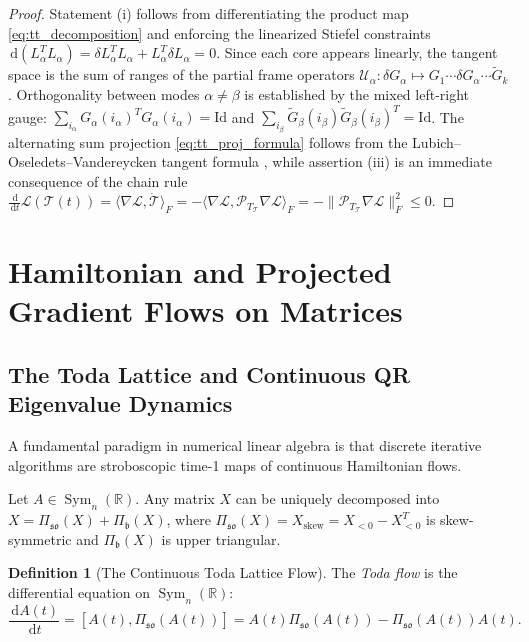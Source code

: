 \documentclass[11pt,a4paper,reqno]{amsart}
\theoremstyle{definition}
\newtheorem{definition}[theorem]{Definition}
\numberwithin{equation}{section}
\newcommand{\R}{\mathbb{R}}
\newcommand{\Id}{\mathrm{Id}}
\newcommand{\dif}{\,\mathrm{d}}
\begin{document}
\begin{proof}
Statement (i) follows from differentiating the product map \eqref{eq:tt_decomposition} and enforcing the linearized Stiefel constraints $\dif(L_\alpha^T L_\alpha) = \delta L_\alpha^T L_\alpha + L_\alpha^T \delta L_\alpha = 0$. Since each core appears linearly, the tangent space is the sum of ranges of the partial frame operators $\mathcal{U}_\alpha \colon \delta G_\alpha \mapsto G_1 \cdots \delta G_\alpha \cdots \widetilde{G}_k$. Orthogonality between modes $\alpha \neq \beta$ is established by the mixed left-right gauge: $\sum_{i_\alpha} G_\alpha(i_\alpha)^T G_\alpha(i_\alpha) = \Id$ and $\sum_{i_\beta} \widetilde{G}_\beta(i_\beta) \widetilde{G}_\beta(i_\beta)^T = \Id$. The alternating sum projection \eqref{eq:tt_proj_formula} follows from the Lubich--Oseledets--Vandereycken tangent formula \cite{absil2009optimization}, while assertion (iii) is an immediate consequence of the chain rule $\frac{\dif}{\dif t}\mathcal{L}(\mathcal{T}(t)) = \langle \nabla \mathcal{L}, \dot{\mathcal{T}} \rangle_F = -\langle \nabla \mathcal{L}, \mathcal{P}_{T_{\mathcal{T}}} \nabla \mathcal{L} \rangle_F = -\|\mathcal{P}_{T_{\mathcal{T}}} \nabla \mathcal{L}\|_F^2 \le 0$.
\end{proof}

\section{Hamiltonian and Projected Gradient Flows on Matrices}
\label{sec:gradient_flows}

\subsection{The Toda Lattice and Continuous QR Eigenvalue Dynamics}
A fundamental paradigm in numerical linear algebra is that discrete iterative algorithms are stroboscopic time-1 maps of continuous Hamiltonian flows.

Let $A \in \operatorname{Sym}_n(\R)$. Any matrix $X$ can be uniquely decomposed into $X = \Pi_{\mathfrak{so}}(X) + \Pi_{\mathfrak{b}}(X)$, where $\Pi_{\mathfrak{so}}(X) = X_{\mathrm{skew}} = X_{<0} - X_{<0}^T$ is skew-symmetric and $\Pi_{\mathfrak{b}}(X)$ is upper triangular.

\begin{definition}[The Continuous Toda Lattice Flow]
The \emph{Toda flow} is the differential equation on $\operatorname{Sym}_n(\R)$:
\begin{equation}
    \label{eq:toda_flow}
    \frac{\dif A(t)}{\dif t} = [A(t), \Pi_{\mathfrak{so}}(A(t))] = A(t) \Pi_{\mathfrak{so}}(A(t)) - \Pi_{\mathfrak{so}}(A(t)) A(t).
\end{equation}
\end{definition}
\end{document}
